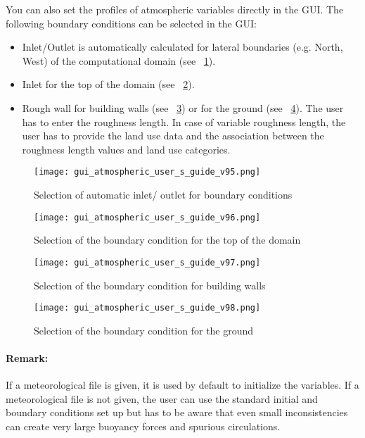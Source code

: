 You can also set the profiles of atmospheric variables directly in the GUI.
The following boundary conditions can be selected in the GUI:
%
\begin{itemize}
\item Inlet/Outlet is automatically calculated for lateral boundaries
(e.g. North, West\textellipsis ) of the computational domain
(see \figurename~\ref{fig:inlet}).
\item Inlet for the top of the domain (see \figurename~\ref{fig:top}).
\item Rough wall for building walls (see \figurename~\ref{fig:walls}) or for
the ground (see \figurename~\ref{fig:ground}).
The user has to enter the roughness length. In case of variable roughness
length, the user has to provide the land use data and the association
between the roughness length values and land use categories.
\end{itemize}
%
\begin{figure}[htbp]
\centerline{\texttt{[image: gui\_atmospheric\_user\_s\_guide\_v95.png]}}
\caption{Selection of automatic inlet/ outlet for boundary conditions }
\label{fig:inlet}
\end{figure}
%
\begin{figure}[htbp]
\centerline{\texttt{[image: gui\_atmospheric\_user\_s\_guide\_v96.png]}}
\caption{Selection of the boundary condition for the top of the domain }
\label{fig:top}
\end{figure}
%
\begin{figure}[htbp]
\centerline{\texttt{[image: gui\_atmospheric\_user\_s\_guide\_v97.png]}}
\caption{Selection of the boundary condition for building walls}
\label{fig:walls}
\end{figure}
%
\begin{figure}[htbp]
\centerline{\texttt{[image: gui\_atmospheric\_user\_s\_guide\_v98.png]}}
\caption{Selection of the boundary condition for the ground}
\label{fig:ground}
\end{figure}

\paragraph{Remark:} If a meteorological file is given, it is used by default to
initialize the variables. If a meteorological file is not given, the user can
use the standard \CS initial and boundary conditions set up but has to be aware
that even small inconsistencies can create very large buoyancy forces and
spurious circulations.

